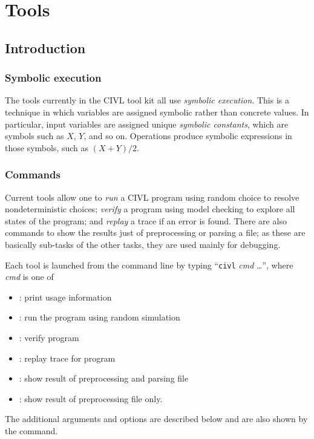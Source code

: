 \part{Tools}
\label{part:tools}

\chapter{Introduction}

\section{Symbolic execution}

The tools currently in the CIVL tool kit all use \emph{symbolic
  execution}.  This is a technique in which variables are assigned
symbolic rather than concrete values.  In particular, input variables
are assigned unique \emph{symbolic constants}, which are symbols such
as $X$, $Y$, and so on.  Operations produce symbolic expressions in
those symbols, such as $(X+Y)/2$.

\section{Commands}

Current tools allow one to \emph{run} a CIVL program using random
choice to resolve nondeterministic choices; \emph{verify} a program
using model checking to explore all states of the program; and
\emph{replay} a trace if an error is found.  There are also commands
to show the results just of preprocessing or parsing a file; as these
are basically sub-tasks of the other tasks, they are used mainly for
debugging.

Each tool is launched from the command line by typing ``\texttt{civl}
\textit{cmd} \ldots'', where \textit{cmd} is one of
\begin{itemize}
\item {} : print usage information
\item {}  : run the program using random simulation
\item {} : verify program
\item {} : replay trace for program
\item {} : show result of preprocessing and parsing file
\item {} : show result of preprocessing file only.
\end{itemize}
The additional arguments and options are described below and are also
shown by the  command.

